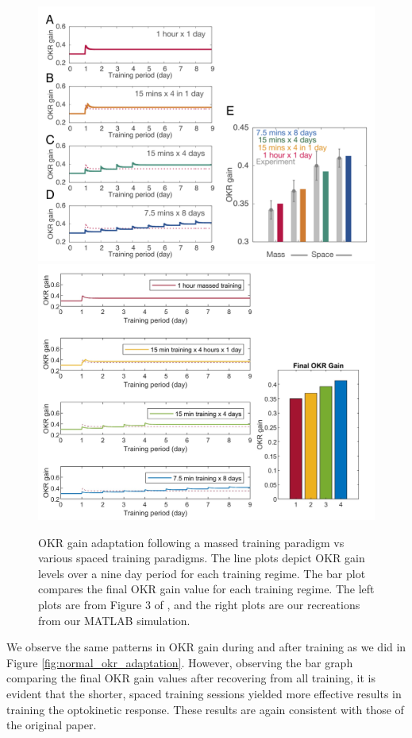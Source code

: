\documentclass[10pt]{article}
\begin{document}
\begin{figure}[h]
    \centering
    \includegraphics[scale=0.60]{images/Fig3_orig.png}
    \includegraphics[scale=0.12]{images/Fig3_rec.jpg}
    \caption{OKR gain adaptation following a massed training paradigm vs various spaced training paradigms. The line plots depict OKR gain levels over a nine day period for each training regime. The bar plot compares the final OKR gain value for each training regime. The left plots are from Figure 3 of \cite{yamazaki2015modeling}, and the right plots are our recreations from our MATLAB simulation.}
    \label{fig:mass_vs_spaced_training}
\end{figure}

We observe the same patterns in OKR gain during and after training as we did in Figure \ref{fig:normal_okr_adaptation}. However, observing the bar graph comparing the final OKR gain values after recovering from all training, it is evident that the shorter, spaced training sessions yielded more effective results in training the optokinetic response. These results are again consistent with those of the original paper.
\end{document}
